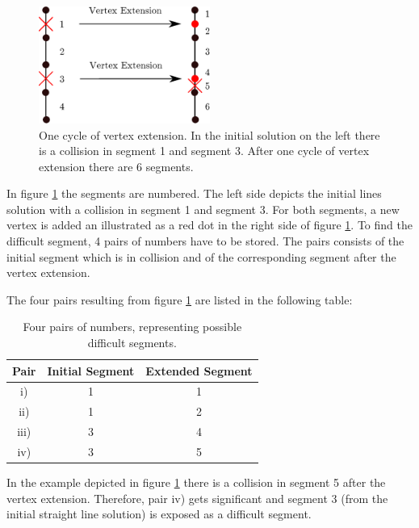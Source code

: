 \begin{figure}[h]
   \centering
   \includegraphics[width=0.5\textwidth]{pics/recogniseSegment.eps}
   \caption{One cycle of vertex extension. In the initial solution on the left there is a collision in segment 1 and segment 3. After one cycle of vertex extension there are 6 segments. }
   \label{pic:recognise}
\end{figure}

In figure \ref{pic:recognise} the segments are numbered. The left side depicts the initial lines solution with a collision in segment 1 and segment 3. For both segments, a new vertex is added an illustrated as a red dot in the right side of figure \ref{pic:recognise}. To find the difficult segment, 4 pairs of numbers have to be stored. The pairs consists of the initial segment which is in collision and of the corresponding segment after the vertex extension. \newpage

The four pairs resulting from figure \ref{pic:recognise} are listed in the following table:

\begin{table}[H] 
\begin{center}
    \begin{tabular}{| c | c | c | }
    \hline
    Pair & Initial Segment & Extended Segment\\ \hline
   i) & 1 & 1 \\ \hline
   ii) & 1 & 2\\ \hline
   iii) & 3 & 4\\ \hline
   iv) & 3 & 5\\
    \hline
    \end{tabular}
    \caption{Four pairs of numbers, representing possible difficult segments.}
    \label{tab:pairsOfNumbers}
\end{center}
\end{table}

In the example depicted in figure \ref{pic:recognise} there is a collision in segment 5 after the vertex extension. 
Therefore, pair iv) gets significant and segment 3 (from the initial straight line solution) is exposed as a difficult segment.


